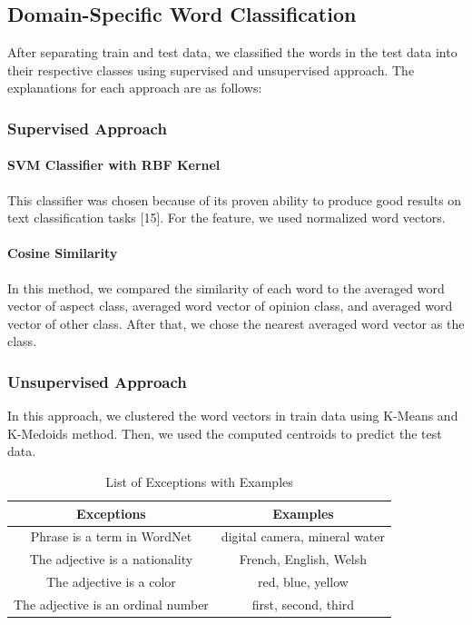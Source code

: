 \documentclass[a4paper,conference]{IEEEtran}
\begin{document}
\subsection{Domain-Specific Word Classification}
After separating train and test data, we classified the words in the test data into their respective classes using supervised and unsupervised approach. The explanations for each approach are as follows:

\subsubsection{Supervised Approach}
\paragraph{SVM Classifier with RBF Kernel}
This classifier was chosen because of its proven ability to produce good results on text classification tasks [15]. For the feature, we used normalized word vectors.

\paragraph{Cosine Similarity}
In this method, we compared the similarity of each word to the averaged word vector of aspect class, averaged word vector of opinion class, and averaged word vector of other class. After that, we chose the nearest averaged word vector as the class.

\subsubsection{Unsupervised Approach}
In this approach, we clustered the word vectors in train data using K-Means and K-Medoids method. Then, we used the computed centroids to predict the test data.

\begin{table}[htbp]
\caption{List of Exceptions with Examples}
\begin{center}
\begin{tabular}{|c|c|}
\hline
\textbf{Exceptions} & \textbf{Examples}\\
\hline
Phrase is a term in WordNet&digital camera, mineral water\\
\hline
The adjective is a nationality&French, English, Welsh\\
\hline
The adjective is a color&red, blue, yellow\\
\hline
The adjective is an ordinal number&first, second, third\\
\hline
\end{tabular}
\label{tab2}
\end{center}
\end{table}
\end{document}
